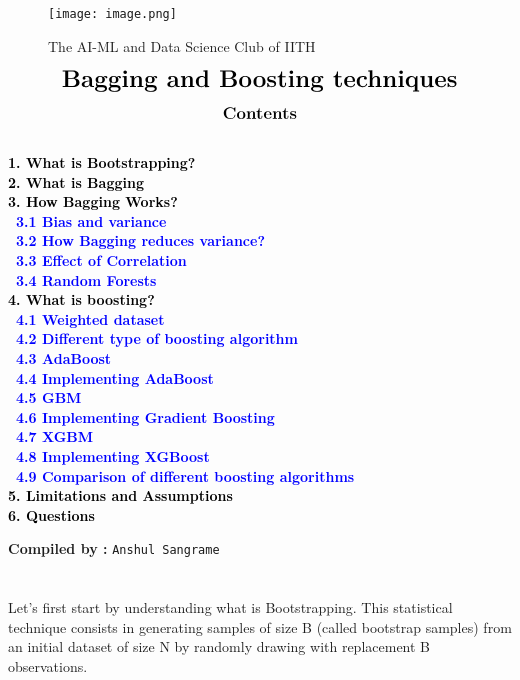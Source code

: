 \documentclass{homework}
\begin{document}
\begin{center}
\begin{figure}[h]
\centering
\texttt{[image: image.png]}
\caption*{{{\selectfont The AI-ML and Data Science Club of IITH}}}
\end{figure}
\end{center}
\begin{align*}
{\LARGE{\textbf{Bagging and Boosting techniques}}}
\end{align*}
\graphicspath{{./media/}}
\begin{align*}
\large{\textbf{{Contents}}}
\end{align*}
{\textcolor{black}{\textbf{
 \\
 1. {What is Bootstrapping?}\\
 2. {What is Bagging}\\
 3. {How Bagging Works?}\\
\indent \    \textcolor{blue}{3.1 Bias and variance}\\
\indent \    \textcolor{blue}{3.2 How Bagging reduces variance?}\\
\indent \    \textcolor{blue}{3.3 Effect of Correlation}\\
\indent \    \textcolor{blue}{3.4 Random Forests}\\
 4. {What is boosting?}\\
\indent \  \textcolor{blue}{4.1 Weighted dataset}\\
\indent \  \textcolor{blue}{4.2 Different type of boosting algorithm}\\
\indent \  \textcolor{blue}{4.3 AdaBoost}\\
\indent \  \textcolor{blue}{4.4 Implementing AdaBoost}\\
\indent \  \textcolor{blue}{4.5 GBM}\\
\indent \  \textcolor{blue}{4.6 Implementing Gradient Boosting}\\
\indent \  \textcolor{blue}{4.7 XGBM}\\
\indent \  \textcolor{blue}{4.8 Implementing XGBoost}\\
\indent \  \textcolor{blue}{4.9 Comparison of different boosting algorithms}\\
5. {Limitations and Assumptions}\\
6. {Questions}}}}
\begin{center}
    {\textbf{Compiled by :}
    \texttt{Anshul Sangrame}}
\end{center}

\newpage
\section{}
Let's first start by understanding what is Bootstrapping. This statistical technique consists in generating samples of size B (called bootstrap samples) from an initial dataset of size N by randomly drawing with replacement B observations.
\end{document}
